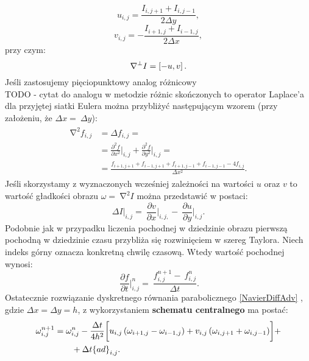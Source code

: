 \documentclass[12pt, twoside, openany]{report}
\theoremstyle{definition}
\begin{document}
\begin{equation}
u_{i,j}=\frac{I_{i,j+1}+I_{i,j-1}}{2\Delta y} 
\label{u}
,
\end{equation}
\begin{equation}
 v_{i,j}=-\frac{I_{i+1,j}+I_{i-1,j}}{2\Delta x}
\label{v}
,
\end{equation}
przy czym:
\begin{equation}\\
{\mathrm{\nabla }}^{\bot }I=\left[-u,v\right]
\label{gradI}
.
\end{equation}
Jeśli zastosujemy pięciopunktowy analog różnicowy \\TODO - cytat do analogu w metodzie różnic skończonych to operator Laplace’a dla przyjętej siatki Eulera można przybliżyć następującym wzorem (przy założeniu, że $\Delta x=\ \Delta y$):
\begin{align}
\begin{aligned}
{\mathrm{\nabla }}^2f_{i,j} &= \Delta f_{i,j}=\\[1ex]
&={\frac{{\partial }^2f}{\partial x^2}}\bigg|_{i,j}+{\frac{{\partial }^2f}{\partial y^2}}\bigg|_{i,j}=\\
&=\frac{f_{i+1,j+1}+f_{i-1,j+1}+f_{i+1,j-1}+f_{i-1,j-1}-4f_{i,j}}{\Delta x^2} .
\end{aligned}
\label{LaplaceOpr}
\end{align}
Jeśli skorzystamy z wyznaczonych wcześniej zależności na wartości $u$ oraz $v$ to wartość gładkości obrazu $\omega =\ {\mathrm{\nabla }}^2I$ można przedstawić w postaci: 
\begin{equation}
\Delta {I}\big|_{i,j}=\ {\frac{\partial v}{\partial x}}\bigg|_{i,j,}-\ {\frac{\partial u}{\partial y}}\bigg|_{i,j}
\label{discreteVorticity}
.
\end{equation}
Podobnie jak w przypadku liczenia pochodnej w dziedzinie obrazu pierwszą pochodną w dziedzinie czasu przybliża się rozwinięciem w szereg Taylora. Niech indeks górny oznacza konkretną chwilę czasową. Wtedy wartość pochodnej wynosi:
\begin{equation}
\ {{\frac{\partial f}{\partial t}}\bigg|^n_{i,j}=\ \frac{f^{n+1}_{i,j}-\ f^n_{i,j}}{\Delta t}}
\label{dfdt}
.
\end{equation}
Ostatecznie rozwiązanie dyskretnego równania parabolicznego \eqref{NavierDiffAdv} , gdzie $\Delta x= \Delta y=h$, z wykorzystaniem \textbf{schematu centralnego} ma postać:
\begin{align}
\omega ^{n+1}_{i,j} &= {\omega }^n_{i,j} - \frac{\Delta t}{4h^2}\biggl[u_{i,j} \left({\omega }_{i+1,j}
-{\omega }_{i-1,j}\right)+ v_{i,j} \left({\omega }_{i,j+1}+{\omega }_{i,j-1}\right)\biggr]+\notag\\ 
&\qquad + \Delta t{\left\{ad\right\}}_{i,j}.
\label{NavierDiffAdvCen}
\end{align}
\end{document}
